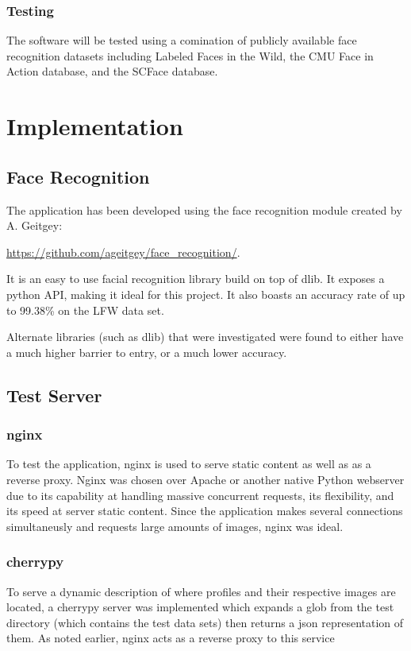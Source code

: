 \documentclass{article}
\begin{document}
\subsubsection{Testing}
The software will be tested using a comination of publicly available face recognition datasets including Labeled Faces in the Wild, the CMU Face in Action database, and the SCFace database. 


\newpage
\section{Implementation}
\subsection{Face Recognition}
The application has been developed using the face recognition module created by A. Geitgey:

\url{https://github.com/ageitgey/face\_recognition/}.

It is an easy to use facial recognition library build on top of dlib. It exposes a python API, making it ideal for this project. It also boasts an accuracy rate of up to 99.38\% on the LFW data set.

Alternate libraries (such as dlib) that were investigated were found to either have a much higher barrier to entry, or a much lower accuracy.

\subsection{Test Server}
\subsubsection{nginx}
To test the application, nginx is used to serve static content as well as as a reverse proxy. Nginx was chosen over Apache or another native Python webserver due to its capability at handling massive concurrent requests, its flexibility, and its speed at server static content. Since the application makes several connections simultaneusly and requests large amounts of images, nginx was ideal.

\subsubsection{cherrypy}
To serve a dynamic description of where profiles and their respective images are located, a cherrypy server was implemented which expands a glob from the test directory (which contains the test data sets) then returns a json representation of them. As noted earlier, nginx acts as a reverse proxy to this service
\end{document}
